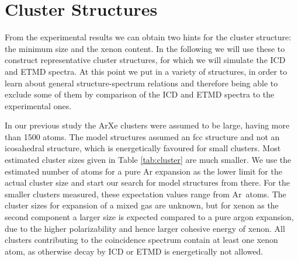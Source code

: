 \section{Cluster Structures}

From the experimental results we can obtain two hints for the cluster
structure: the minimum size and the xenon content. In the following we will 
use these to construct representative cluster structures, for which we will 
simulate the ICD and ETMD spectra. At this point we put in a variety of
structures, in order to learn about general structure-spectrum relations
and therefore being able to
exclude some of them by comparison of
the ICD and ETMD spectra to the experimental ones.

In our previous study\cite{Fasshauer13} the ArXe clusters were assumed
to be large, having more than 1500 atoms. The model structures assumed
an fcc structure and not an icosahedral structure, which is energetically
favoured for small clusters.
Most estimated cluster sizes given in Table \ref{tab:cluster} are much smaller.
We use the estimated number of atoms for a pure Ar expansion as the lower limit for the actual cluster size and start our search for model structures from there.
%
%
For the smaller clusters measured,
these expectation values range from \unit[3--21]{Ar atoms}. 
The cluster sizes for expansion of a mixed gas are unknown, but
for xenon as the second component a larger size is expected compared to a
pure argon expansion, due to the higher polarizability
and hence larger cohesive energy of xenon. All clusters
contributing to the coincidence spectrum
contain at least one xenon atom, as otherwise decay by ICD or ETMD is energetically not allowed.


